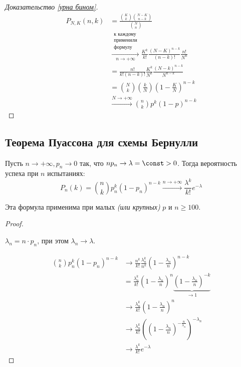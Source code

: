 \documentclass[12pt, a4paper, oneside]{book}
\begin{document}
\begin{proof}[Доказательство \ref{урна бином}]
    \begin{align*}
        P_{N, K}(n, k) & = \frac{\binom{K}{k} \binom{N - K}{n - k}}{\binom{N}{n}}                         \\
                       & \xrightarrow[n \to +\infty]{\substack{\text{к каждому}                           \\ \text{применили} \\ \text{формулу}}} \frac{K^k}{k!} \frac{(N-K)^{n-k}}{(n-k)!} \frac{n!}{N^n}   \\
                       & = \frac{n!}{k!(n - k)!} \frac{K^k}{N^k} \frac{(N - k)^{n - k}}{N^{n - k}}        \\
                       & = \binom{N}{k} \left( \frac{k}{N} \right) \left( 1 - \frac{K}{N} \right)^{n - k} \\
                       & \xrightarrow{N \to +\infty} \binom{n}{k} p^k (1 - p)^{n - k}
    \end{align*}
\end{proof}

\subsection{Теорема Пуассона для схемы Бернулли}

\begin{theorem}
    Пусть \(n \to +\infty, p_n \to 0\) так, что \(n p_n \to \lambda =\const > 0\). Тогда вероятность успеха при \(n\) испытаниях:
    \[P_n(k) = \binom{n}{k}p_n^k (1 - p_n)^{n - k} \xrightarrow{n \to +\infty} \frac{\lambda^k}{k!}e^{ - \lambda} \]

    Эта формула применима при малых \textit{(или крупных)} \(p\) и \(n \geq 100\).
\end{theorem}
\begin{proof}
    \begin{obozn}
        \(\lambda_n = n\cdot p_n\), при этом \(\lambda_n \to \lambda\).
    \end{obozn}

    \begin{align*}
        \binom{n}{k}p_n^k (1 - p_n)^{n - k} & \to \frac{n^k}{k!} \frac{\lambda_n^k}{n^k} \left( 1 - \frac{\lambda_n}{n} \right)^{n - k}                                             \\
                                            & = \frac{\lambda_n^k}{k!} \left( 1 - \frac{\lambda_n}{n} \right)^{n} \underbrace{\left( 1 - \frac{\lambda_n}{n} \right)^{- k}}_{\to 1} \\
                                            & \to \frac{\lambda_n^k}{k!} \left( 1 - \frac{\lambda_n}{n} \right)^{n}                                                                 \\
                                            & \to \frac{\lambda_n^k}{k!} \left(\left( 1 - \frac{\lambda_n}{n} \right)^{ - \frac{n}{\lambda_n} } \right)^{ - \lambda_n}              \\
                                            & \to \frac{\lambda^k}{k!}e^{ - \lambda}
    \end{align*}
\end{proof}
\end{document}
